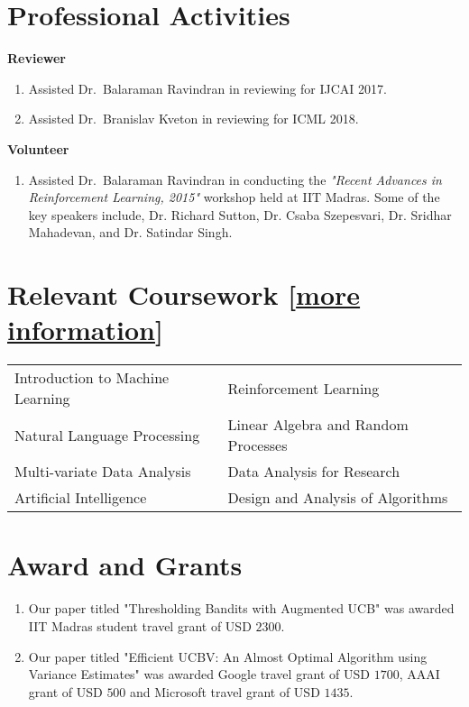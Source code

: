 \documentclass[margin,11pt]{res}
\begin{document}
\begin{resume}

\section{Professional Activities}
\textbf{Reviewer} 
\begin{enumerate}
\item Assisted Dr.~Balaraman Ravindran in reviewing for IJCAI 2017.
\item Assisted Dr.~Branislav Kveton in reviewing for ICML 2018.
\end{enumerate}

\textbf{Volunteer} 
\begin{enumerate}
\item Assisted Dr.~Balaraman Ravindran in conducting the \textit{"Recent Advances in Reinforcement Learning, 2015"} workshop held at IIT Madras. Some of the key speakers include, Dr. Richard Sutton, Dr. Csaba Szepesvari, Dr. Sridhar Mahadevan, and Dr. Satindar Singh.
\end{enumerate}


\section{Relevant Coursework [\href{https://github.com/Subhojyoti/subhojyoti.github.io/blob/master/pdf/Courses\%20Information.pdf}{more information}]}
\begin{tabular}{ll}
Introduction to Machine Learning & Reinforcement Learning  \\
Natural Language Processing & Linear Algebra and Random Processes \\
Multi-variate Data Analysis & Data Analysis for Research \\
Artificial Intelligence & Design and Analysis of Algorithms \\
\end{tabular}

\section{Award and Grants}
\begin{enumerate}
\item Our paper titled "Thresholding Bandits with Augmented UCB" was awarded IIT Madras student travel grant of USD $2300$.
\item Our paper titled "Efficient UCBV: An Almost Optimal Algorithm using Variance Estimates" was awarded Google travel grant of USD $1700$, AAAI grant of USD $500$ and Microsoft travel grant of USD $1435$.
\end{enumerate}



\end{resume}
\end{document}
